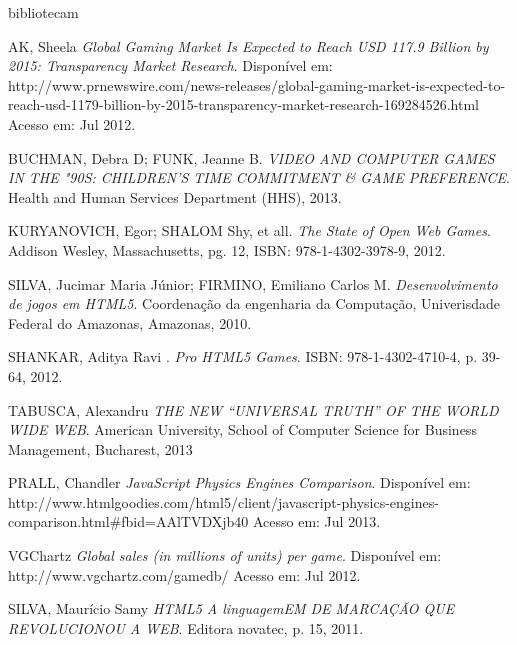 \documentclass{article}
\begin{document}
%
%
bibliotecam\begin{thebibliography}{99}

AK, Sheela
\emph{ Global Gaming Market Is Expected to Reach USD 117.9 Billion by 2015: Transparency Market Research}.
Disponível em: http://www.prnewswire.com/news-releases/global-gaming-market-is-expected-to-reach-usd-1179-billion-by-2015-transparency-market-research-169284526.html
Acesso em: Jul 2012.

 
BUCHMAN, Debra D; FUNK, Jeanne B. 
\emph{VIDEO AND COMPUTER GAMES IN THE "90S: CHILDREN'S TIME COMMITMENT & GAME PREFERENCE}. 
Health and Human Services Department (HHS), 2013.


  KURYANOVICH, Egor; SHALOM Shy, et all.
  \emph{The State of Open Web Games}.
  Addison Wesley, Massachusetts, pg. 12,
  ISBN: 978-1-4302-3978-9,
  2012.

SILVA, Jucimar Maria Júnior; FIRMINO, Emiliano Carlos M.
  \emph{Desenvolvimento de jogos em HTML5}.
  Coordenação da engenharia da Computação,
  Univerisdade Federal do Amazonas,
  Amazonas,
  2010.

SHANKAR, Aditya Ravi .
  \emph{Pro HTML5 Games}.
 ISBN: 978-1-4302-4710-4, p. 39-64,
 2012.

TABUSCA, Alexandru
  \emph{THE NEW “UNIVERSAL TRUTH” OF THE WORLD WIDE WEB}.
American University, School of Computer Science for
Business Management, Bucharest, 2013

PRALL, Chandler
  \emph{JavaScript Physics Engines Comparison}.
Disponível em: http://www.htmlgoodies.com/html5/client/javascript-physics-engines-comparison.html#fbid=AAlTVDXjb40
Acesso em: Jul 2013.

VGChartz
  \emph{Global sales (in millions of units) per game}.
Disponível em: http://www.vgchartz.com/gamedb/
Acesso em: Jul 2012.



SILVA, Maurício Samy
\emph{HTML5 A linguagemEM DE MARCAÇÃO QUE REVOLUCIONOU A WEB}. 
Editora novatec, p. 15, 2011.


\end{thebibliography}
\end{document}
